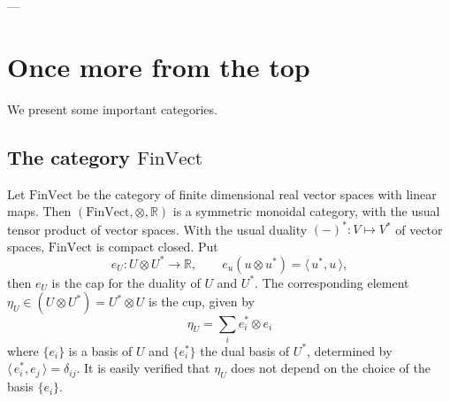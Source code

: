 \documentclass[12pt]{article}
\newtheorem{lemma}{Lemma}
\theoremstyle{definition}
\theoremstyle{remark}
\def\<{\langle\,}
\def\>{\,\rangle}
\def \FV{\mathrm{FinVect}}
\def\bX{ X}
\def\bY{ Y}
\begin{document}
%
%
%
%
%
%
---
\section{Once more from the top}

We present some important categories.

\subsection{The category $\FV$}

Let  $\FV$ be the category of finite dimensional real vector spaces with linear maps. Then
$(\FV,\otimes, \mathbb R)$ is a symmetric monoidal category, with the usual tensor product
of vector spaces. With the usual duality $(-)^*: V\mapsto V^*$  of vector spaces, $\FV$ is
compact closed.  Put
\[
e_U: U\otimes U^*\to \mathbb R,\qquad e_u(u\otimes u^*)=\<u^*,u\>,
\]
then $e_U$ is the cap for the duality of $U$ and $U^*$. The corresponding element
$\eta_U\in (U\otimes U^*)=U^*\otimes U$ is the cup, given by
\[
\eta_U=\sum_i e_i^*\otimes e_i
\]
where $\{e_i\}$ is a basis of $U$ and $\{e_i^*\}$ the dual basis of $U^*$, determined by
$\<e_i^*,e_j\>=\delta_{ij}$. It is easily verified that $\eta_U$ does not depend on the
choice of the basis $\{e_i\}$.
\end{document}
